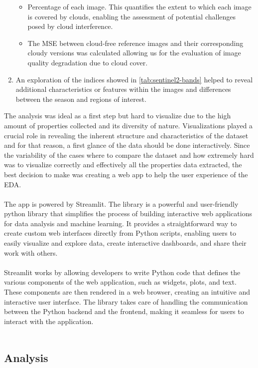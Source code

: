 \documentclass[11pt, a4paper]{article}
\begin{document}
\begin{enumerate}
		\begin{itemize}
			\item Percentage of each image. This quantifies the extent to which each image is covered by clouds, enabling the assessment of potential challenges posed by cloud interference.
			\item The MSE between cloud-free reference images and their corresponding cloudy versions was calculated allowing us for the evaluation of image quality degradation due to cloud cover.
		\end{itemize}
		\item An exploration of the indices showed in \ref{tab:sentinel2-bands} helped to reveal additional characteristics or features within the images and differences between the season and regions of interest.
	\end{enumerate}
	The analysis was ideal as a first step but hard to visualize due to the high amount of properties collected and its diversity of nature. Visualizations played a crucial role in revealing the inherent structure and characteristics of the dataset and for that reason, a first glance of the data should be done interactively. 
	Since the variability of the cases where to compare the dataset and how extremely hard was to visualize correctly and effectively all the properties data extracted, the best decision to make was creating a web app to help the user experience of the EDA. 
	\\
	\\
	The app is powered by Streamlit. The library is a powerful and user-friendly python library that simplifies the process of building interactive web applications for data analysis and machine learning. It provides a straightforward way to create custom web interfaces directly from Python scripts, enabling users to easily visualize and explore data, create interactive dashboards, and share their work with others.
	\\\\
	Streamlit works by allowing developers to write Python code that defines the various components of the web application, such as widgets, plots, and text. These components are then rendered in a web browser, creating an intuitive and interactive user interface. The library takes care of handling the communication between the Python backend and the frontend, making it seamless for users to interact with the application.
	\\\\
	
	\subsection{Analysis}
\end{document}
